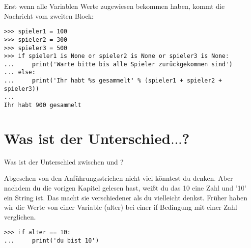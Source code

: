 \noindent
Erst wenn alle Variablen Werte zugewiesen bekommen haben, kommt die Nachricht vom zweiten Block:

\begin{Verbatim}[frame=single]
>>> spieler1 = 100
>>> spieler2 = 300
>>> spieler3 = 500
>>> if spieler1 is None or spieler2 is None or spieler3 is None:
...     print('Warte bitte bis alle Spieler zurückgekommen sind')
... else:
...     print('Ihr habt %s gesammelt' % (spieler1 + spieler2 + spieler3))
...
Ihr habt 900 gesammelt
\end{Verbatim}

\section{Was ist der Unterschied$\ldots$?}\label{whatsthedifference}

Was ist der Unterschied zwischen  und ?
\par
Abgesehen von den Anführungsstrichen nicht viel könntest du denken.  Aber nachdem du die vorigen Kapitel gelesen hast, weißt du das 10 eine Zahl und '10' ein String ist. Das macht sie verschiedener als du vielleicht denkst. Früher haben wir die Werte von einer Variable (alter) bei einer if-Bedingung mit einer Zahl verglichen.

\begin{Verbatim}[frame=single]
>>> if alter == 10:
...     print('du bist 10')
\end{Verbatim}

